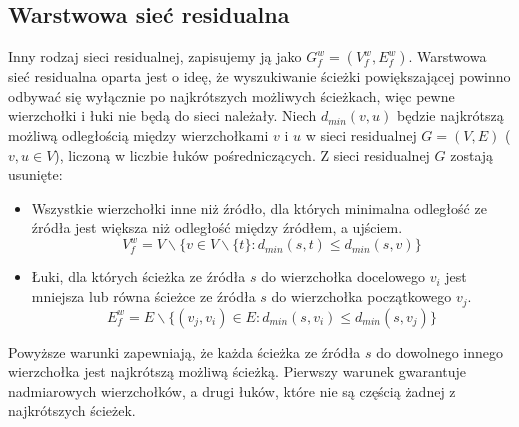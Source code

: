 \subsection{Warstwowa sieć residualna}\label{ssec:WSR}
Inny rodzaj sieci residualnej, zapisujemy ją jako $ G_f^w=(V_f^w,E_f^w) $. Warstwowa sieć residualna oparta jest o ideę, że wyszukiwanie ścieżki powiększającej powinno odbywać się wyłącznie po najkrótszych możliwych ścieżkach, więc pewne wierzchołki i łuki nie będą do sieci należały. Niech $ d_{min}(v,u) $ będzie najkrótszą możliwą odległością między wierzchołkami $ v $ i $ u $ w sieci residualnej $ G=(V,E) $ ($ v,u\in V $), liczoną w liczbie łuków pośredniczących. Z sieci residualnej $ G $ zostają usunięte:
\begin{itemize}
	\item Wszystkie wierzchołki inne niż źródło, dla których minimalna odległość ze źródła jest większa niż odległość między źródłem, a ujściem.
	$$ V_f^w=V\backslash\{v\in V\backslash\{t\} : d_{min}(s,t)\le d_{min}(s,v)\} $$
	\item Łuki, dla których ścieżka ze źródła $ s $ do wierzchołka docelowego $ v_i $ jest mniejsza lub równa ścieżce ze źródła $ s $ do wierzchołka początkowego $ v_j $.
	$$ E_f^w=E\backslash\{(v_j,v_i)\in E : d_{min}(s,v_i)\le d_{min}(s,v_j)\} $$	
\end{itemize}
Powyższe warunki zapewniają, że każda ścieżka ze źródła $ s $ do dowolnego innego wierzchołka jest najkrótszą możliwą ścieżką. Pierwszy warunek gwarantuje nadmiarowych wierzchołków, a drugi łuków, które nie są częścią żadnej z najkrótszych ścieżek.
